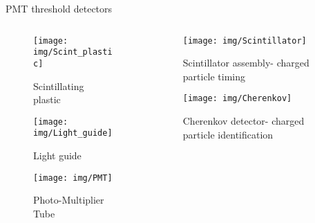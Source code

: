 \documentclass[9pt]{beamer}
\begin{document}
\begin{frame}{PMT threshold detectors}
  \begin{columns}
    \begin{column}{.4\textwidth}
    \vspace*{-0.2cm}
    \begin{figure}\texttt{[image: img/Scint\_plastic]}\vspace*{-0.2cm}\caption{Scintillating plastic}\end{figure}\vspace*{-0.5cm}
    \begin{figure}\texttt{[image: img/Light\_guide]}\vspace*{-0.2cm}\caption{Light guide}\end{figure}\vspace*{-0.5cm}
    \begin{figure}\texttt{[image: img/PMT]}\vspace*{-0.2cm}\caption{Photo-Multiplier Tube}\end{figure}\vspace*{-0.5cm}
    \end{column}
    \begin{column}{.6\textwidth}
    \vspace*{-0.5cm}
    \begin{figure}\texttt{[image: img/Scintillator]}\vspace*{-0.2cm}\caption{Scintillator assembly\newline- charged particle timing}\end{figure}\vspace*{-0.5cm}
    \begin{figure}\texttt{[image: img/Cherenkov]}\vspace*{-0.2cm}\caption{Cherenkov detector\newline- charged particle identification}\end{figure}\vspace*{-0.5cm}
    \end{column}
  \end{columns}
\end{frame}
\end{document}
